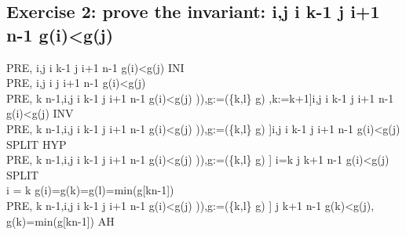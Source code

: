 \documentclass[11pt,a4paper,fleqn]{article}
\begin{document}
\subsection{Exercise 2: prove the invariant: \forall i,j \cdot i  \upto k-1 \wedge j \in i+1 \upto n-1 \Rightarrow g(i)<g(j)}
\noindent
PRE, \vdash [k:=0]\forall i,j \cdot i  \upto k-1 \wedge j \in i+1 \upto n-1 \Rightarrow g(i)<g(j) \; INI \\
PRE, \vdash \forall i,j \cdot i   \wedge j \in i+1 \upto n-1 \Rightarrow g(i)<g(j) \\
PRE, k \neq n-1,\forall i,j \cdot i  \upto k-1 \wedge j \in i+1 \upto n-1 \Rightarrow g(i)<g(j) \vdash [l:=g^{-1}(min(g[k\upto n-1])),g:=(\{k,l\} \domsub g) ,k:=k+1]\forall i,j \cdot i  \upto k-1 \wedge j \in i+1 \upto n-1 \Rightarrow g(i)<g(j) \; INV \\ 
PRE, k \neq n-1,\forall i,j \cdot i  \upto k-1 \wedge j \in i+1 \upto n-1 \Rightarrow g(i)<g(j) \vdash [l:=g^{-1}(min(g[k\upto n-1])),g:=(\{k,l\} \domsub g) ]\forall i,j \cdot i  \upto k-1 \wedge j \in i+1 \upto n-1 \Rightarrow g(i)<g(j) \;SPLIT \;HYP\\
PRE, k \neq n-1,\forall i,j \cdot i  \upto k-1 \wedge j \in i+1 \upto n-1 \Rightarrow g(i)<g(j) \vdash [l:=g^{-1}(min(g[k\upto n-1])),g:=(\{k,l\} \domsub g) ] i=k \wedge j \in k+1 \upto n-1 \Rightarrow g(i)<g(j) \;SPLIT \\
i = k \vdash g(i)=g(k)=g(l)=min(g[k\upto n-1]) \\
PRE, k \neq n-1,\forall i,j \cdot i  \upto k-1 \wedge j \in i+1 \upto n-1 \Rightarrow g(i)<g(j) \vdash [l:=g^{-1}(min(g[k\upto n-1])),g:=(\{k,l\} \domsub g) ] j \in k+1 \upto n-1 \Rightarrow g(k)<g(j), g(k)=min(g[k\upto n-1]) \; AH \\
\end{document}
